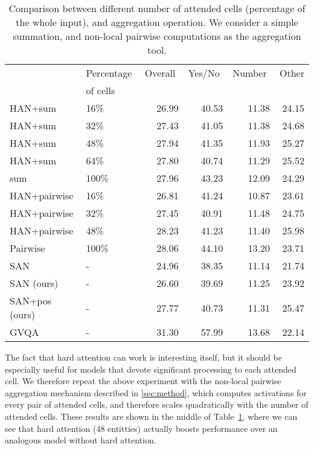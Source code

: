 \begin{table}
\begin{center}
\begin{tabular}{llrrrr}
\toprule
 & Percentage\,\, & Overall\,\, & Yes/No\,\, & Number\,\, & Other \\
 & of cells\,\,  & & & & \\
 \cmidrule(ll){1-2}\cmidrule(lr){3-6}
 HAN+sum & 16\% & 26.99 & 40.53 & 11.38 & 24.15 \\
 HAN+sum & 32\% & 27.43 & 41.05 & 11.38 & 24.68 \\
 HAN+sum & 48\% & 27.94 & 41.35 & 11.93 & 25.27 \\
 HAN+sum & 64\% & 27.80 & 40.74 & 11.29 & 25.52 \\
 sum & 100\% & 27.96 & 43.23 & 12.09 & 24.29 \\ 
\midrule
 HAN+pairwise & 16\% & 26.81 & 41.24 & 10.87 & 23.61 \\
 HAN+pairwise & 32\% & 27.45 & 40.91 & 11.48 & 24.75 \\
 HAN+pairwise & 48\% & 28.23 & 41.23 & 11.40 & 25.98 \\
 Pairwise & 100\%  & 28.06 & 44.10 & 13.20 & 23.71 \\
 \midrule
  SAN \cite{agrawal2017don,yang2015stacked} & - & 24.96 & 38.35 & 11.14 & 21.74 \\
  SAN (ours) & - & 26.60 & 39.69 & 11.25 & 23.92 \\
  SAN+pos (ours) & - & 27.77 & 40.73 & 11.31 & 25.47 \\
  \midrule
  GVQA \cite{agrawal2017don} & - & 31.30 & 57.99 & 13.68 & 22.14 \\
\bottomrule
\end{tabular}
\end{center}
\caption{
Comparison between different number of attended cells (percentage of the whole input), and aggregation operation. We consider a simple summation, and non-local pairwise computations as the aggregation tool. 
}
\label{table:han-mhsa-attention_numbers}
\end{table}

The fact that hard attention can work is interesting itself, but it should be especially useful for models that devote significant processing to each attended cell.  
We therefore repeat the above experiment with the non-local pairwise aggregation mechanism described in \autoref{sec:method}, which computes activations for every pair of attended cells, and therefore scales quadratically with the number of attended cells.
These results are shown in the middle of Table~\ref{table:han-mhsa-attention_numbers}, where we can see that hard attention (48 entitties) actually boosts performance over an analogous model without hard attention.

